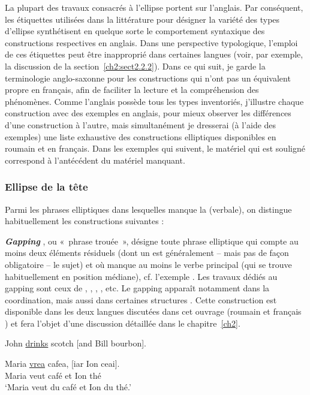 La plupart des travaux consacrés à l’ellipse portent sur l’anglais. Par conséquent, les étiquettes utilisées dans la littérature pour désigner la variété des types d’ellipse synthétisent en quelque sorte le comportement syntaxique des constructions respectives en anglais. Dans une perspective typologique, l’emploi de ces étiquettes peut être inapproprié dans certaines langues (voir, par exemple, la discussion de la section~\ref{ch2:sect2.2.2}). Dans ce qui suit, je garde la terminologie anglo-saxonne pour les constructions qui n’ont pas un équivalent propre en français, afin de faciliter la lecture et la compréhension des phénomènes. Comme l’anglais possède tous les types inventoriés, j’illustre chaque construction avec des exemples en anglais, pour mieux observer les différences d’une construction à l’autre, mais simultanément je dresserai (à l’aide des exemples) une liste exhaustive des constructions elliptiques disponibles en roumain et en français. Dans les exemples qui suivent, le matériel qui est souligné correspond à l’antécédent du matériel manquant.


\subsubsection{Ellipse de la tête} \label{ch1:sect1.4.1.1}

Parmi les phrases elliptiques dans lesquelles manque la  (verbale), on distingue habituellement les constructions suivantes :

\textbf{\textit{Gapping}} \citep{Ross1967,Ross1970}, ou «~phrase trouée~», désigne toute phrase elliptique qui compte au moins deux éléments résiduels (dont un est généralement – mais pas de façon obligatoire – le sujet)  et où manque au moins le verbe principal (qui se trouve habituellement en position médiane), cf. l’exemple . Les travaux dédiés au gapping sont ceux de \citet{Neijt1979}, \citet{Gardent1991}, \citet{Hartmann2000}, \citet{Repp2009}, etc. Le gapping apparaît notamment dans la coordination, mais aussi dans certaines structures . Cette construction est disponible dans les deux langues discutées dans cet ouvrage (roumain  et français ) et fera l’objet d’une discussion détaillée dans le chapitre~\ref{ch2}. 

\newpage 
\ea
John \uline{drinks} scotch [and Bill bourbon]. \label{ch1:ex42} 
\z

\ea
\gll Maria  \uline{vrea}  cafea,  [iar  Ion  ceai]. \label{ch1:ex43}\\
Maria  veut  café  et  Ion  thé \\
\glt ‘Maria veut du café et Ion du thé.’ 
\z

